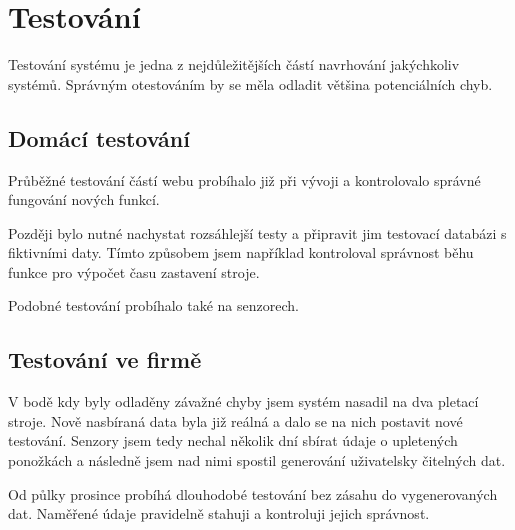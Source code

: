 \chapter{Testování}
Testování systému je jedna z nejdůležitějších částí navrhování jakýchkoliv systémů.
Správným otestováním by se měla odladit většina potenciálních chyb.

\section{Domácí testování}
Průběžné testování částí webu probíhalo již při vývoji a kontrolovalo správné fungování nových funkcí.

Později bylo nutné nachystat rozsáhlejší testy a připravit jim testovací databázi s fiktivními daty.
Tímto způsobem jsem například kontroloval správnost běhu funkce pro výpočet času zastavení stroje.

Podobné testování probíhalo také na senzorech. 


\section{Testování ve firmě}
V bodě kdy byly odladěny závažné chyby jsem systém nasadil na dva pletací stroje.
Nově nasbíraná data byla již reálná a dalo se na nich postavit nové testování.
Senzory jsem tedy nechal několik dní sbírat údaje o upletených ponožkách a následně jsem nad nimi spostil generování uživatelsky čitelných dat.

Od půlky prosince probíhá dlouhodobé testování bez zásahu do vygenerovaných dat. Naměřené údaje pravidelně stahuji a kontroluji jejich správnost.

\newpage